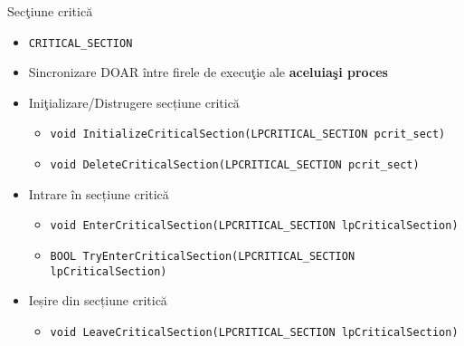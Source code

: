 \documentclass{so.cs.pub.ro}
\begin{document}
\begin{frame}{Secţiune critică}
	\begin{itemize}
		\item \texttt{CRITICAL_SECTION}
		\item Sincronizare DOAR între firele de execuţie ale \textbf{aceluiaşi proces}
		\item Iniţializare/Distrugere secțiune critică
			\begin{itemize}
				\item \texttt{void InitializeCriticalSection(LPCRITICAL_SECTION pcrit_sect)}
				\item \texttt{void DeleteCriticalSection(LPCRITICAL_SECTION pcrit_sect)}
			\end{itemize}
		\item Intrare în secțiune critică
			\begin{itemize}
				\item \texttt{void EnterCriticalSection(LPCRITICAL_SECTION lpCriticalSection)}
				\item \texttt{BOOL TryEnterCriticalSection(LPCRITICAL_SECTION lpCriticalSection)}
                        \end{itemize}
                \item Ieșire din secțiune critică
                        \begin{itemize}
				\item \texttt{void LeaveCriticalSection(LPCRITICAL_SECTION lpCriticalSection)}
			\end{itemize}
	\end{itemize}
\end{frame}
\end{document}
